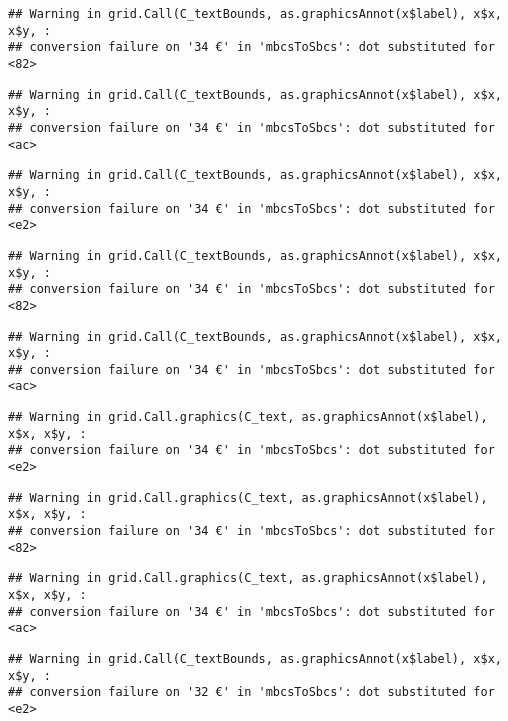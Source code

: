 \documentclass[
]{article}
\begin{document}
\begin{verbatim}
## Warning in grid.Call(C_textBounds, as.graphicsAnnot(x$label), x$x, x$y, :
## conversion failure on '34 €' in 'mbcsToSbcs': dot substituted for <82>
\end{verbatim}

\begin{verbatim}
## Warning in grid.Call(C_textBounds, as.graphicsAnnot(x$label), x$x, x$y, :
## conversion failure on '34 €' in 'mbcsToSbcs': dot substituted for <ac>
\end{verbatim}

\begin{verbatim}
## Warning in grid.Call(C_textBounds, as.graphicsAnnot(x$label), x$x, x$y, :
## conversion failure on '34 €' in 'mbcsToSbcs': dot substituted for <e2>
\end{verbatim}

\begin{verbatim}
## Warning in grid.Call(C_textBounds, as.graphicsAnnot(x$label), x$x, x$y, :
## conversion failure on '34 €' in 'mbcsToSbcs': dot substituted for <82>
\end{verbatim}

\begin{verbatim}
## Warning in grid.Call(C_textBounds, as.graphicsAnnot(x$label), x$x, x$y, :
## conversion failure on '34 €' in 'mbcsToSbcs': dot substituted for <ac>
\end{verbatim}

\begin{verbatim}
## Warning in grid.Call.graphics(C_text, as.graphicsAnnot(x$label), x$x, x$y, :
## conversion failure on '34 €' in 'mbcsToSbcs': dot substituted for <e2>
\end{verbatim}

\begin{verbatim}
## Warning in grid.Call.graphics(C_text, as.graphicsAnnot(x$label), x$x, x$y, :
## conversion failure on '34 €' in 'mbcsToSbcs': dot substituted for <82>
\end{verbatim}

\begin{verbatim}
## Warning in grid.Call.graphics(C_text, as.graphicsAnnot(x$label), x$x, x$y, :
## conversion failure on '34 €' in 'mbcsToSbcs': dot substituted for <ac>
\end{verbatim}

\begin{verbatim}
## Warning in grid.Call(C_textBounds, as.graphicsAnnot(x$label), x$x, x$y, :
## conversion failure on '32 €' in 'mbcsToSbcs': dot substituted for <e2>
\end{verbatim}
\end{document}
